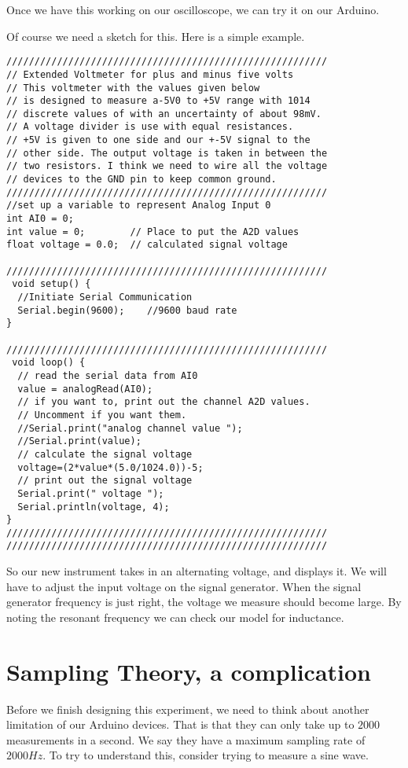 Once we have this working on our oscilloscope, we can try it on our Arduino.

Of course we need a sketch for this. Here is a simple example.
 \begin{lstlisting}[language=Arduino]
/////////////////////////////////////////////////////////
// Extended Voltmeter for plus and minus five volts
// This voltmeter with the values given below
// is designed to measure a-5V0 to +5V range with 1014 
// discrete values of with an uncertainty of about 98mV. 
// A voltage divider is use with equal resistances. 
// +5V is given to one side and our +-5V signal to the 
// other side. The output voltage is taken in between the 
// two resistors. I think we need to wire all the voltage 
// devices to the GND pin to keep common ground. 
/////////////////////////////////////////////////////////
//set up a variable to represent Analog Input 0
int AI0 = 0;          
int value = 0;        // Place to put the A2D values
float voltage = 0.0;  // calculated signal voltage
 
/////////////////////////////////////////////////////////
 void setup() {
  //Initiate Serial Communication
  Serial.begin(9600);    //9600 baud rate
}
 
/////////////////////////////////////////////////////////
 void loop() {
  // read the serial data from AI0
  value = analogRead(AI0);
  // if you want to, print out the channel A2D values. 
  // Uncomment if you want them.
  //Serial.print("analog channel value ");
  //Serial.print(value);
  // calculate the signal voltage 
  voltage=(2*value*(5.0/1024.0))-5;
  // print out the signal voltage
  Serial.print(" voltage ");
  Serial.println(voltage, 4);  
}
/////////////////////////////////////////////////////////
/////////////////////////////////////////////////////////
 \end{lstlisting}

So our new instrument takes in an alternating voltage, and displays it. We
will have to adjust the input voltage on the signal generator. When the
signal generator frequency is just right, the voltage we measure should
become large. By noting the resonant frequency we can check our model for
inductance.

\section{Sampling Theory, a complication}

Before we finish designing this experiment, we need to think about another
limitation of our Arduino devices. That is that they can only take up to $%
2000$ measurements in a second. We say they have a maximum sampling rate of $%
2000\unit{Hz}.$ To try to understand this, consider trying to measure a sine
wave.

